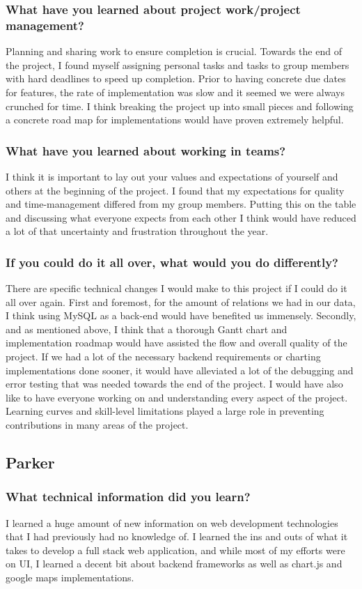 \documentclass[journal,10pt,onecolumn,compsoc]{IEEEtran}
\begin{document}
    \subsubsection{What have you learned about project work/project management?}
    Planning and sharing work to ensure completion is crucial. Towards the end of the project, I found myself assigning personal tasks and tasks to group members with hard deadlines to speed up completion. Prior to having concrete due dates for features, the rate of implementation was slow and it seemed we were always crunched for time. I think breaking the project up into small pieces and following a concrete road map for implementations would have proven extremely helpful. 
    \subsubsection{What have you learned about working in teams?}
    I think it is important to lay out your values and expectations of yourself and others at the beginning of the project. I found that my expectations for quality and time-management differed from my group members. Putting this on the table and discussing what everyone expects from each other I think would have reduced a lot of that uncertainty and frustration throughout the year. 
    \subsubsection{If you could do it all over, what would you do differently?} 
    There are specific technical changes I would make to this project if I could do it all over again. First and foremost, for the amount of relations we had in our data, I think using MySQL as a back-end would have benefited us immensely. Secondly, and as mentioned above, I think that a thorough Gantt chart and implementation roadmap would have assisted the flow and overall quality of the project. If we had a lot of the necessary backend requirements or charting implementations done sooner, it would have alleviated a lot of the debugging and error testing that was needed towards the end of the project. I would have also like to have everyone working on and understanding every aspect of the project. Learning curves and skill-level limitations played a large role in preventing contributions in many areas of the project.
    \subsection{Parker}
    \subsubsection{What technical information did you learn?}  
	I learned a huge amount of new information on web development technologies that I had previously had no knowledge of. I learned the ins and outs of what it takes to develop a full stack web application, and while most of my efforts were on UI, I learned a decent bit about backend frameworks as well as chart.js and google maps implementations.
\end{document}
